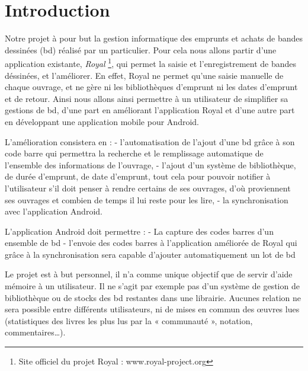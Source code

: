 \part*{Introduction}
Notre projet à pour but la gestion informatique des emprunts et achats de bandes dessinées (bd) réalisé par un particulier.
Pour cela nous allons partir d'une application existante, \emph{Royal}
\footnote{Site officiel du projet Royal : www.royal-project.org}, qui permet la saisie et l'enregistrement de bandes déssinées, et l'améliorer.
En effet, Royal ne permet qu'une saisie manuelle de chaque ouvrage, et ne gère ni les bibliothèques d'emprunt ni les dates d'emprunt et de retour. Ainsi nous allons ainsi permettre à un utilisateur de simplifier sa gestions de bd, d'une part en améliorant l'application Royal et d'une autre part en développant une application mobile pour Android.

L'amélioration consistera en :
- l'automatisation de l'ajout d'une bd grâce à son code barre qui permettra la recherche et le remplissage automatique de l'ensemble des informations de l'ouvrage,
- l'ajout d'un système de bibliothèque, de durée d'emprunt, de date d'emprunt, tout cela pour pouvoir notifier à l'utilisateur s'il doit penser à rendre certains de ses ouvrages, d'où proviennent ses ouvrages et combien de temps il lui reste pour les lire,
- la synchronisation avec l'application Android.

L'application Android doit permettre :
- La capture des codes barres d'un ensemble de bd
- l'envoie des codes barres à l'application améliorée de Royal qui grâce à la synchronisation sera capable d'ajouter automatiquement un lot de bd

Le projet est à but personnel, il n'a comme unique objectif que de servir d'aide mémoire à un utilisateur.
Il ne s'agit par exemple pas d'un système de gestion de bibliothèque ou de stocks des bd restantes dans une librairie.
Aucunes relation ne sera possible entre différents utilisateurs, ni de mises en commun des œuvres lues
(statistiques des livres les plus lus par la « communauté », notation, commentaires…).
